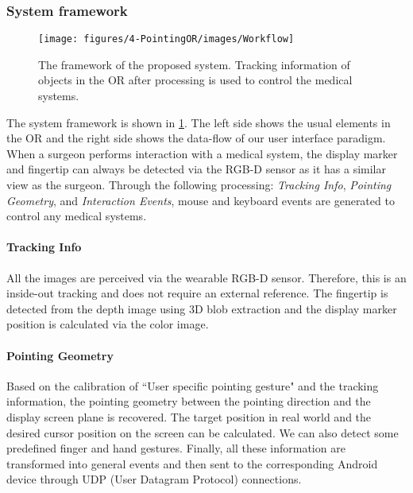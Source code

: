 \subsubsection{System framework}
\begin{figure}
	\centering
	\texttt{[image: figures/4-PointingOR/images/Workflow]}
	\caption{The framework of the proposed system. Tracking information of objects in the OR after processing is used to control the medical systems. }
	\label{fig:Workflow}       %
\end{figure}
The system framework is shown in \figurename{\ref{fig:Workflow}}.
The left side shows the usual elements in the OR and the right side shows the data-flow of our user interface paradigm. When a surgeon performs interaction with a medical system, the display marker and fingertip can always be detected via the RGB-D sensor as it has a similar view as the surgeon. 
Through the following processing: \textit{Tracking Info}, \textit{Pointing Geometry}, and \textit{Interaction Events}, mouse and keyboard events are generated to control any medical systems.
\paragraph{Tracking Info} 
All the images are perceived via the wearable RGB-D sensor. Therefore, this is an inside-out tracking and does not require an external reference. The fingertip is detected from the depth image using 3D blob extraction and the display marker position is calculated via the color image.
\paragraph{Pointing Geometry}
Based on the calibration of ``User specific pointing gesture" and the tracking information,
the pointing geometry between the pointing direction and the display screen plane is recovered. The target position in real world and the desired cursor position on the screen can be calculated. We can also detect some predefined finger and hand gestures. Finally, all these information are transformed into general events and then sent to the corresponding Android device through UDP (User Datagram Protocol) connections. 
